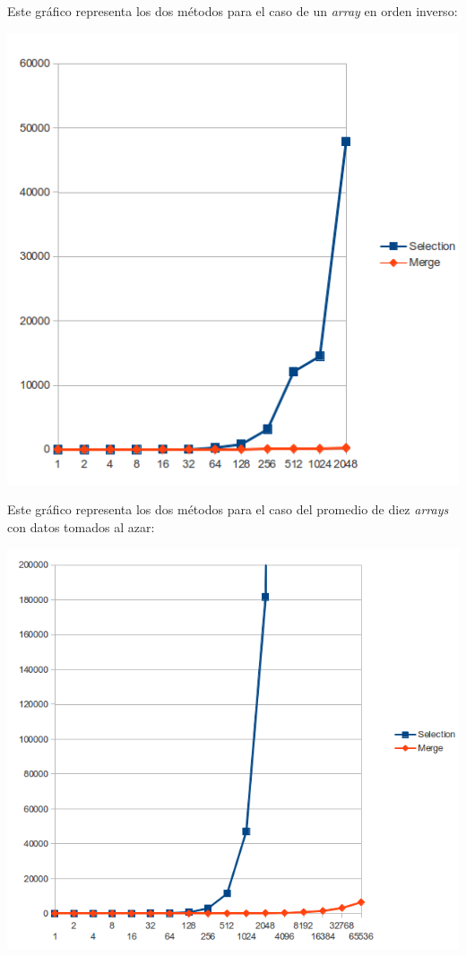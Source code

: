 \documentclass[a4paper,10pt]{article}
\begin{document}
Este gr\'afico representa los dos m\'etodos para el caso de un \textit{array} en orden inverso:
\begin{center}
\includegraphics[scale=0.50]{reverted.png}
\end{center}

Este gr\'afico representa los dos m\'etodos para el caso del promedio de diez \textit{arrays} con datos tomados al azar:
\begin{center}
\includegraphics[scale=0.50]{random.png}
\end{center}
\end{document}
